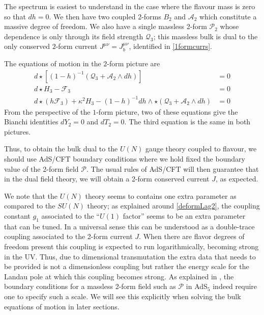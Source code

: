 \documentclass[aps,preprint,nofootinbib,preprintnumbers,eqsecnum,superscriptaddress]{revtex4}
\newcommand\sP{{\mathcal P}}
\begin{document}
The spectrum is easiest to understand in the case where the flavour mass is zero so that $dh = 0$. We then have two coupled 2-forms $B_2$ and $\mathcal{A}_2$ which constitute a massive degree of freedom. We also have a single massless 2-form $\mathcal{P}_2$ whose dependence is only through its field strength $\mathcal{Q}_3$; this massless bulk is dual to the only conserved $2$-form current $J^{\mu\nu} = J_b^{\mu\nu}$, identified in \eqref{1formcurrs}. 

The equations of motion in the $2$-form picture are
\begin{subequations}
	\begin{align}
	d \star [(1-h)^{-1}(\mathcal{Q}_3 + \mathcal{A}_2 \wedge dh)] & = 0	\\
	d \star H_3 - \mathcal{F}_3 & = 0		\\
	d \star (h \mathcal{F}_3) + \kappa^2 H_3 - (1-h)^{-1} dh \wedge \star (\mathcal{Q}_3 + \mathcal{A}_2 \wedge dh) & = 0
	\end{align}
\end{subequations}
From the perspective of the $1$-form picture, two of these equations give the Bianchi identities $d Y_2 = 0$ and $d T_2 = 0$. The third equation is the same in both pictures.

Thus, to obtain the bulk dual to the $U(N)$ gauge theory coupled to flavour, we should use AdS/CFT boundary conditions where we hold fixed the boundary value of the 2-form field $\sP$. The usual rules of AdS/CFT will then guarantee that in the dual field theory, we will obtain a 2-form conserved current $J$, as expected. 

We note that the $U(N)$ theory seems to contains one extra parameter as compared to the $SU(N)$ theory; as explained around \eqref{deformLag2}, the coupling constant $g_1$ associated to the ``$U(1)$ factor'' seems to be an extra parameter that can be tuned. In a universal sense this can be understood as a double-trace coupling associated to the 2-form current $J$. When there are flavor degrees of freedom present this coupling is expected to run logarithmically, becoming strong in the UV. Thus, due to dimensional transmutation the extra data that needs to be provided is not a dimensionless coupling but rather the energy scale for the Landau pole at which this coupling becomes strong. As explained in \cite{Hofman:2017vwr,Faulkner:2012gt}, the boundary conditions for a massless 2-form field such as $\sP$ in AdS$_5$ indeed require one to specify such a scale. We will see this explicitly when solving the bulk equations of motion in later sections. 
\end{document}
